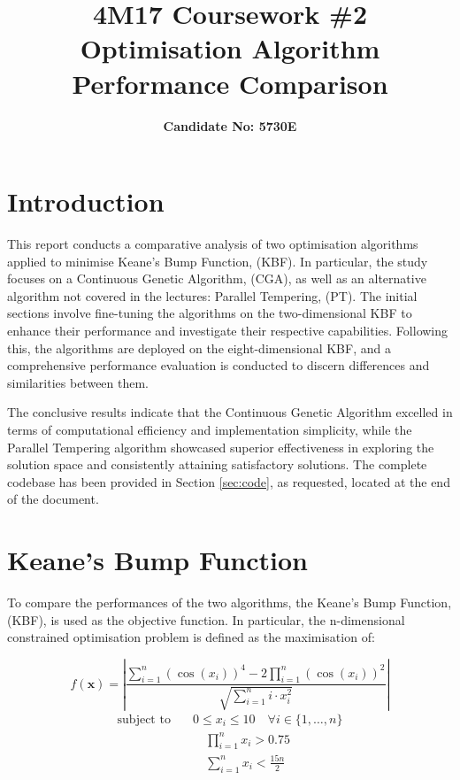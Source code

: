\documentclass[10pt]{article}
\title{\textbf{4M17 Coursework \#2 \\ Optimisation Algorithm Performance Comparison}}
\author{\textbf{Candidate No: 5730E}}
\begin{document}

\vspace{-3cm}
\maketitle
\begin{multicols}{2}
\section{Introduction}
This report conducts a comparative analysis of two optimisation algorithms applied to minimise Keane's Bump Function, (KBF). In particular, the study focuses on a Continuous Genetic Algorithm, (CGA), as well as an alternative algorithm not covered in the lectures: Parallel Tempering, (PT). The initial sections involve fine-tuning the algorithms on the two-dimensional KBF to enhance their performance and investigate their respective capabilities. Following this, the algorithms are deployed on the eight-dimensional KBF, and a comprehensive performance evaluation is conducted to discern differences and similarities between them. 


The conclusive results indicate that the Continuous Genetic Algorithm excelled in terms of computational efficiency and implementation simplicity, while the Parallel Tempering algorithm showcased superior effectiveness in exploring the solution space and consistently attaining satisfactory solutions. The complete codebase has been provided in Section \ref{sec:code}, as requested, located at the end of the document.
\section{Keane's Bump Function}

To compare the performances of the two algorithms, the Keane's Bump Function, (KBF), is used as the objective function. In particular, the n-dimensional constrained optimisation problem is defined as the maximisation of:

\begin{equation}
    f(\mathbf{x}) = \left| \frac{\sum_{i=1}^{n} (\cos(x_i))^4 - 2\prod_{i=1}^{n} (\cos(x_i))^2}{\sqrt{\sum_{i=1}^{n} i \cdot x_i^2}} \right|
    \label{eq:KBF_cost}
\end{equation}
\begin{equation}
    \begin{aligned}
        \text{subject to} \quad & 0 \leq x_i \leq 10 \quad \forall i \in \{1, \dots, n\} \\
        & \quad \prod_{i=1}^{n} x_i > 0.75 \\
        & \quad \sum_{i=1}^{n} x_i < \frac{15n}{2}
    \end{aligned} 
    \label{eq:KBF_constraints}
\end{equation}


\end{multicols}
\end{document}
